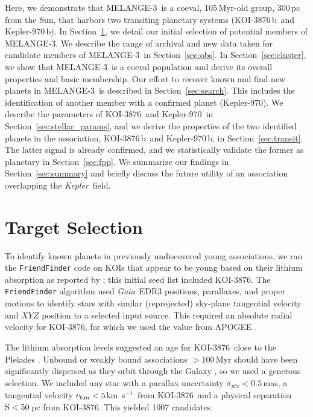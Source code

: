 \documentclass[twocolumn, linenumbers]{aastex631}
\newcommand{\clustername}{MELANGE-3}
\newcommand{\association}{MELANGE-3}
\newcommand{\starname}{KOI-3876}
\newcommand{\planetname}{KOI-3876\,b}
\newcommand{\starnametwo}{Kepler-970}
\newcommand{\planetnametwo}{Kepler-970\,b}
\newcommand{\kepler}{{\it Kepler}}
\newcommand\kms{km~s$^{-1}$}
\newcommand{\gaia}{\textit{Gaia}}
\begin{document}
Here, we demonstrate that \association\ is a coeval, 105\,Myr-old group, 300\,pc from the Sun, that harbors two transiting planetary systems (\planetname\ and \planetnametwo). In Section~\ref{sec:target}, we detail our initial selection of potential members of \clustername. We describe the range of archival and new data taken for candidate members of \clustername\ in Section~\ref{sec:obs}. In Section~\ref{sec:cluster}, we show that \clustername\ is a coeval population and derive its overall properties and basic membership. Our effort to recover known and find new planets in \clustername\ is described in Section~\ref{sec:search}. This includes the identification of another member with a confirmed planet (\starnametwo). We describe the parameters of \starname\ and \starnametwo\ in Section~\ref{sec:stellar_params}, and we derive the properties of the two identified planets in the association, \planetname\ and \planetnametwo, in Section~\ref{sec:transit}. The latter signal is already confirmed, and we statistically validate the former as planetary in Section~\ref{sec:fpp}. We summarize our findings in Section~\ref{sec:summary} and briefly discuss the future utility of an association overlapping the \kepler\ field. 


\section{Target Selection}\label{sec:target}

To identify known planets in previously undiscovered young associations, we ran the \texttt{FriendFinder} code \citep{THYMEV} on KOIs that appear to be young based on their lithium absorption as reported by \citet{2018ApJ...855..115B}; this initial seed list included \starname. The \texttt{FriendFinder} algorithm used \gaia\ EDR3 positions, parallaxes, and proper motions to identify stars with similar (reprojected) sky-plane tangential velocity and $XYZ$ position to a selected input source. This required an absolute radial velocity for \starname, for which we used the value from APOGEE \citep[$v_{\rm{rad}}=-26.79$\kms;][]{2020AJ....160..120J}. 

The lithium absorption levels suggested an age for \starname\ close to the Pleiades \citep{2018A&A...613A..63B}. Unbound or weakly bound associations $>$100\,Myr should have been significantly dispersed as they orbit through the Galaxy \citep{2019ARA&A..57..227K}, so we used a generous selection. We included any star with a parallax uncertainty $\sigma_{plx}<0.5$\,mas, a tangential velocity $v_{\rm{tan}}<5$\kms\ from \starname\ and a physical separation $\rm{S}<50$\,pc from \starname. This yielded 1007 candidates. 
\end{document}
